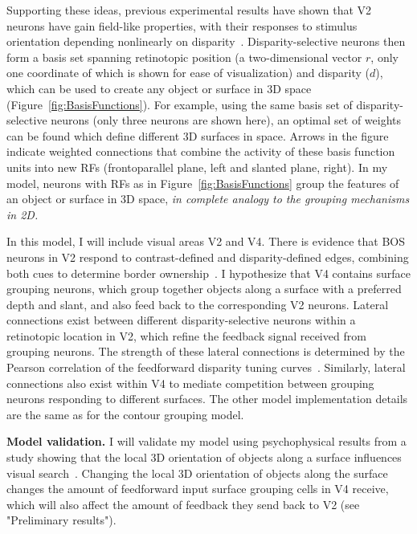 \documentclass[11pt]{article}
\begin{document}
Supporting these ideas, previous experimental results have shown that
V2 neurons have gain field-like properties, with their responses to
stimulus orientation depending nonlinearly on
disparity~\citep{vonderHeydt_etal00a}. Disparity-selective neurons
then form a basis set spanning retinotopic position (a two-dimensional
vector $r$, only one coordinate of which is shown for ease of visualization)
and disparity ($d$), which can be used to create any object or surface
in 3D space (Figure~\ref{fig:BasisFunctions}). For example, using the
same basis set of disparity-selective neurons (only three neurons are
shown here), an optimal set of weights can be found which define
different 3D surfaces in space. Arrows in the figure indicate weighted
connections that combine the activity of these basis function units
into new RFs (frontoparallel plane, left and slanted plane, right). In
my model, neurons with RFs as in Figure~\ref{fig:BasisFunctions} group
the features of an object or surface in 3D space, {\em in complete analogy
to the grouping mechanisms in 2D.}

In this model, I will include visual areas V2 and V4. There is
evidence that BOS 
neurons in V2 respond to contrast-defined and disparity-defined edges,
combining both cues to determine border
ownership~\citep{Qiu_vonderHeydt05}. I hypothesize that V4 contains surface grouping
neurons, which group together objects along a surface with a preferred
depth and slant, and also feed back to the corresponding V2
neurons. Lateral connections exist between different
disparity-selective neurons within a retinotopic location in V2, which
refine the feedback signal received from grouping neurons. The
strength of these lateral connections is determined by the Pearson
correlation of the feedforward disparity tuning
curves~\citep{Samonds_etal13}. Similarly, lateral connections also
exist within V4 to mediate competition between grouping neurons
responding to different surfaces. The other model implementation
details are the same as for the contour grouping model. 

\textbf{Model validation.} I will validate my model using
psychophysical results from a study showing that the local 3D
orientation of objects along a surface influences visual
search~\citep{He_Nakayama95}. Changing the local 3D orientation of
objects along the surface changes the amount of feedforward input
surface grouping cells in V4 receive, which will also affect the
amount of feedback they send back to V2 (see "Preliminary results"). 
\end{document}
